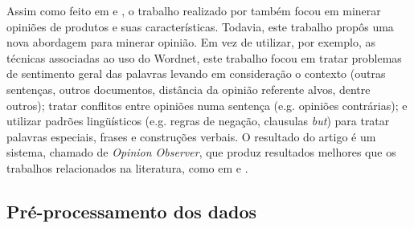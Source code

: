 Assim como feito em \cite{Hu:2004} e \cite{kim2004determining}, o trabalho realizado por \cite{ding2008holistic} também focou em minerar opiniões de produtos e suas características. Todavia, este trabalho propôs uma nova abordagem para minerar opinião. Em vez de utilizar, por exemplo, as técnicas associadas ao uso do Wordnet, este trabalho focou em tratar problemas de sentimento geral das palavras levando em consideração o contexto (outras sentenças, outros documentos, distância da opinião referente alvos, dentre outros); tratar conflitos entre opiniões numa sentença (e.g. opiniões contrárias); e utilizar padrões lingüísticos (e.g. regras de negação, clausulas \textit{but}) para tratar palavras especiais, frases e construções verbais. O resultado do artigo é um sistema, chamado de \textit{Opinion Observer}, que produz resultados melhores que os trabalhos relacionados na literatura, como em \cite{Hu:2004} e  \cite{kim2004determining}.

\subsection{Pré-processamento dos dados}